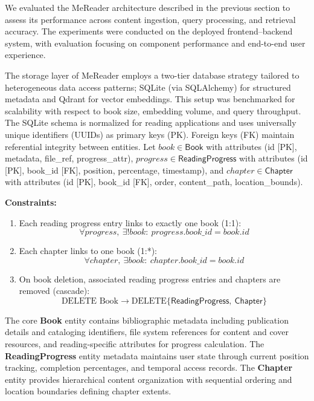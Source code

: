 We evaluated the MeReader architecture described in the previous section to assess its performance across content ingestion, query processing, and retrieval accuracy. The experiments were conducted on the deployed frontend–backend system, with evaluation focusing on component performance and end-to-end user experience.

The storage layer of MeReader employs a two-tier database strategy tailored to heterogeneous data access patterns; SQLite (via SQLAlchemy) for structured metadata and Qdrant for vector embeddings. This setup was benchmarked for scalability with respect to book size, embedding volume, and query throughput. The SQLite schema is normalized for reading applications and uses universally unique identifiers (UUIDs) as primary keys (PK). 
Foreign keys (FK) maintain referential integrity between entities.
\noindent Let $book \in \mathsf{Book}$ with attributes (id [PK], metadata, file\_ref, progress\_attr), $progress \in \mathsf{ReadingProgress}$ with attributes (id [PK], book\_id [FK], position, percentage, timestamp), and $chapter \in \mathsf{Chapter}$ with attributes (id [PK], book\_id [FK], order, content\_path, location\_bounds).

\noindent\textbf{Constraints:}
\begin{enumerate}[leftmargin=*,nosep]
    \item Each reading progress entry links to exactly one book (1:1):
    \[
        \forall progress,\ \exists! book:\ progress.book\_id = book.id
    \]
    \item Each chapter links to one book (1:*):
    \[
        \forall chapter,\ \exists book:\ chapter.book\_id = book.id
    \]
    \item On book deletion, associated reading progress entries and chapters are removed (cascade):
    \[
        \text{DELETE Book} \rightarrow \text{DELETE} \{\mathsf{ReadingProgress},\ \mathsf{Chapter}\}
    \]
\end{enumerate}

The core \textbf{Book} entity contains bibliographic metadata including publication details and cataloging identifiers, file system references for content and cover resources, and reading-specific attributes for progress calculation.
The \textbf{ReadingProgress} entity metadata maintains user state through current position tracking, completion percentages, and temporal access records.
The \textbf{Chapter} entity provides hierarchical content organization with sequential ordering and location boundaries defining chapter extents.

